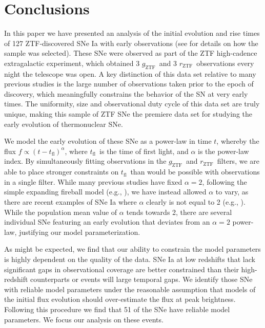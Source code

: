 \documentclass[twocolumn]{./aastex63}
\newcommand{\rztf}{$r_\mathrm{ZTF}$}
\newcommand{\gztf}{$g_\mathrm{ZTF}$}
\newcommand{\tfl}{$t_\mathrm{fl}$}
\begin{document}
\section{Conclusions}

In this paper we have presented an analysis of the initial evolution and rise
times of 127 ZTF-discovered SNe Ia with early observations (see \citealt{Yao19}
for details on how the sample was selected). These SNe were observed as part of
the ZTF high-cadence extragalactic experiment, which obtained 3 \gztf\ and 3
\rztf\ observations every night the telescope was open. A key distinction of
this data set relative to many previous studies is the large number of
observations taken prior to the epoch of discovery, which meaningfully
constrains the behavior of the SN at very early times. The uniformity, size and
observational duty cycle of this data set are truly unique, making this sample
of ZTF SNe the premiere data set for studying the early evolution of
thermonuclear SNe.

We model the early evolution of these SNe as a power-law in time $t$, whereby
the flux $f \propto (t - t_\mathrm{fl})^\alpha$, where \tfl\ is the time of
first light, and $\alpha$ is the power-law index. By simultaneously fitting
observations in the \gztf\ and \rztf\ filters, we are able to place stronger
constraints on \tfl\ than would be possible with observations in a single
filter. While many previous studies have fixed $\alpha = 2$, following the
simple expanding fireball model (e.g., \citealt{Riess99a}), we have instead
allowed $\alpha$ to vary, as there are recent examples of SNe Ia where
$\alpha$ clearly is not equal to 2 (e.g., \citealt{Zheng13,
Shappee16,Miller18,Dimitriadis19}). While the population mean value of
$\alpha$ tends towards 2, there are several individual SNe featuring an early
evolution that deviates from an $\alpha = 2$ power-law, justifying our model
parameterization.

As might be expected, we find that our ability to constrain the model
parameters is highly dependent on the quality of the data. SNe Ia at low
redshifts that lack significant gaps in observational coverage are better
constrained than their high-redshift counterparts or events will large
temporal gaps. We identify those SNe with reliable model parameters under the
reasonable assumption that models of the initial flux evolution should
over-estimate the flux at peak brightness. Following this procedure we find
that 51 of the SNe have reliable model parameters. We focus our analysis on
these events.
\end{document}

